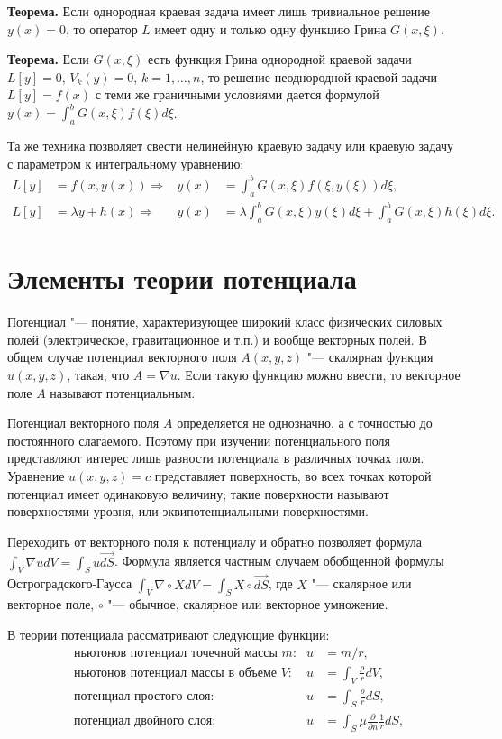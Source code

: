 \documentclass[a4paper,12pt]{article}
\begin{document}
\textbf{Теорема.} Если однородная краевая задача имеет лишь тривиальное решение
$y(x)=0$, то оператор $L$ имеет одну и только одну функцию Грина $G(x,\xi)$.

\textbf{Теорема.} Если $G(x,\xi)$ есть функция Грина однородной краевой задачи
$L[y]=0$, $V_k(y)=0$, $k=1,\dots,n$, то решение неоднородной краевой задачи
$L[y]=f(x)$ с теми же граничными условиями дается формулой
$y(x)=\int_{a}^{b}G(x,\xi)f(\xi)d\xi$.

Та же техника позволяет свести нелинейную краевую задачу
или краевую задачу с параметром к интегральному уравнению:
\begin{align*}
L[y]&=f(x,y(x)) \Rightarrow
    &y(x)&=\int_a^b G(x,\xi)f(\xi,y(\xi))d\xi,\\
L[y]&=\lambda y+h(x) \Rightarrow
    &y(x)&=\lambda\int_a^b G(x,\xi)y(\xi)d\xi+\int_a^b G(x,\xi)h(\xi)d\xi.
\end{align*}


\section{Элементы теории потенциала}

Потенциал "--- понятие, характеризующее широкий класс физических
силовых полей (электрическое, гравитационное и т.п.) и вообще
векторных полей. В общем случае потенциал векторного поля $A(x,y,z)$ "---
скалярная функция $u(x,y,z)$, такая, что $A=\nabla u$. Если такую функцию
можно ввести, то векторное поле $A$ называют потенциальным.

Потенциал векторного поля $A$ определяется не однозначно, а с точностью
до постоянного слагаемого. Поэтому при изучении потенциального поля
представляют интерес лишь разности потенциала в различных точках поля.
Уравнение $u(x,y,z)=c$ представляет поверхность, во всех точках которой
потенциал имеет одинаковую величину; такие поверхности называют
поверхностями уровня, или эквипотенциальными поверхностями.

Переходить от векторного поля к потенциалу и обратно позволяет формула
$\int_V \nabla udV=\int_S u\vec{dS}$. Формула является частным случаем
обобщенной формулы Остроградского-Гаусса
$\int_V \nabla\circ XdV=\int_S X\circ\vec{dS}$, где $X$ "--- скалярное
или векторное поле, $\circ$ "--- обычное, скалярное или векторное умножение.

В теории потенциала рассматривают следующие функции:
\begin{align*}
&\text{ньютонов потенциал точечной массы $m$:}
    &u&=m/r,\\
&\text{ньютонов потенциал массы в объеме $V$:}
    &u&=\int_V\frac{\rho}{r}dV,\\
&\text{потенциал простого слоя:}
    &u&=\int_S\frac{\rho}{r}dS,\\
&\text{потенциал двойного слоя:}
    &u&=\int_S\mu\frac{\partial}{\partial n}\frac{1}{r}dS,\\
\end{align*}
\end{document}
